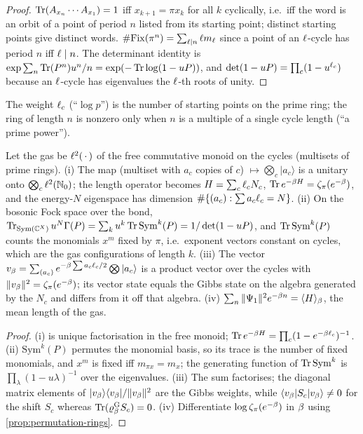 \begin{proof}
$\operatorname{Tr}(A_{x_n}\cdots A_{x_1}) = 1$ iff $x_{k+1} = \pi x_k$ for all $k$ cyclically, i.e.\ iff the
word is an orbit of a point of period $n$ listed from its starting point; distinct starting points
give distinct words. $\#\mathrm{Fix}(\pi^n) = \sum_{\ell\mid n}\ell m_\ell$ since a point of an
$\ell$-cycle has period $n$ iff $\ell\mid n$. The determinant identity is
$\exp\sum_n\operatorname{Tr}(P^n)u^n/n = \exp(-\operatorname{Tr}\log(1-uP))$, and $\det(1-uP) = \prod_c(1-u^{\ell_c})$ because
an $\ell$-cycle has eigenvalues the $\ell$-th roots of unity.
\end{proof}

The weight $\ell_c$ (``$\log p$'') is the number of starting points on the prime ring; the ring of
length $n$ is nonzero only when $n$ is a multiple of a single cycle length (``a prime power'').

\begin{proposition}
\label{prop:permutation-gas}
Let the gas be $\ell^2(\,\cdot\,)$ of the free commutative monoid on the cycles (multisets of prime rings).
(i) The map (multiset with $a_c$ copies of $c$) $\mapsto\bigotimes_c|a_c\rangle$ is a unitary onto
$\bigotimes_c\ell^2(\mathbb N_0)$; the length operator becomes $H = \sum_c\ell_cN_c$, $\operatorname{Tr} e^{-\beta H} =
\zeta_\pi(e^{-\beta})$, and the energy-$N$ eigenspace has dimension $\#\{(a_c):\sum a_c\ell_c = N\}$.
(ii) On the bosonic Fock space over the bond, $\operatorname{Tr}_{\mathrm{Sym}(\mathbb C^X)}u^N\Gamma(P) =
\sum_k u^k\operatorname{Tr}\mathrm{Sym}^k(P) = 1/\det(1-uP)$, and $\operatorname{Tr}\mathrm{Sym}^k(P)$ counts the monomials
$x^m$ fixed by $\pi$, i.e.\ exponent vectors constant on cycles, which are the gas
configurations of length $k$. (iii) The vector $v_\beta = \sum_{(a_c)}e^{-\beta\sum a_c\ell_c/2}
\bigotimes|a_c\rangle$ is a product vector over the cycles with $\|v_\beta\|^2 = \zeta_\pi(e^{-\beta})$;
its vector state equals the Gibbs state on the algebra generated by the $N_c$ and differs from it
off that algebra. (iv) $\sum_n\|\Psi_1\|^2e^{-\beta n} = \langle H\rangle_\beta$, the mean length
of the gas.
\end{proposition}

\begin{proof}
(i) is unique factorisation in the free monoid; $\operatorname{Tr} e^{-\beta H} = \prod_c(1-e^{-\beta\ell_c})^{-1}$.
(ii) $\mathrm{Sym}^k(P)$ permutes the monomial basis, so its trace is the number of fixed monomials,
and $x^m$ is fixed iff $m_{\pi x} = m_x$; the generating function of $\operatorname{Tr}\mathrm{Sym}^k$ is
$\prod_\lambda(1-u\lambda)^{-1}$ over the eigenvalues. (iii) The sum factorises; the diagonal
matrix elements of $|v_\beta\rangle\langle v_\beta|/\|v_\beta\|^2$ are the Gibbs weights, while
$\langle v_\beta|S_c|v_\beta\rangle\ne0$ for the shift $S_c$ whereas $\operatorname{Tr}(\varrho^{\mathrm{G}}_{\beta}S_c) = 0$.
(iv) Differentiate $\log\zeta_\pi(e^{-\beta})$ in $\beta$ using \cref{prop:permutation-rings}.
\end{proof}

